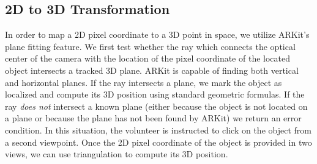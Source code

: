 \documentclass[chi_draft]{sigchi}
\begin{document}
\subsection{2D to 3D Transformation}
In order to map a 2D pixel coordinate to a 3D point in space, we utilize ARKit's plane fitting feature.  We first test whether the ray which connects the optical center of the camera with the location of the pixel coordinate of the located object intersects a tracked 3D plane. ARKit is capable of finding both vertical and horizontal planes.  If the ray intersects a plane, we mark the object as localized and compute its 3D position using standard geometric formulas.  If the ray \emph{does not} intersect a known plane (either because the object is not located on a plane or because the plane has not been found by ARKit) we return an error condition.  In this situation, the volunteer is instructed to click on the object from a second viewpoint.  Once the 2D pixel coordinate of the object is provided in two views, we can use triangulation to compute its 3D position. %
%
%

%
\end{document}
